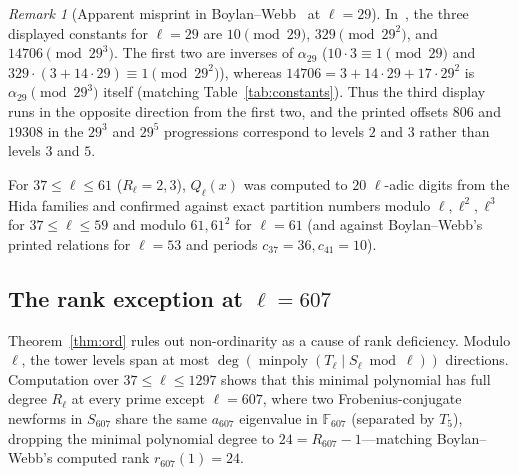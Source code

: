 \documentclass[11pt,reqno]{amsart}
\theoremstyle{definition}
\theoremstyle{remark}
\newtheorem{remark}[theorem]{Remark}
\newcommand{\F}{\mathbb{F}}
\begin{document}
\begin{remark}[Apparent misprint in Boylan--Webb~\cite{BW} at $\ell = 29$]
In~\cite[\S6.1]{BW}, the three displayed constants for $\ell = 29$ are $10 \pmod{29}$, $329 \pmod{29^2}$, and $14706 \pmod{29^3}$. The first two are inverses of $\alpha_{29}$ ($10 \cdot 3 \equiv 1 \pmod{29}$ and $329 \cdot (3 + 14\cdot 29) \equiv 1 \pmod{29^2}$), whereas $14706 = 3 + 14\cdot 29 + 17\cdot 29^2$ is $\alpha_{29} \pmod{29^3}$ itself (matching Table~\ref{tab:constants}). Thus the third display runs in the opposite direction from the first two, and the printed offsets $806$ and $19308$ in the $29^3$ and $29^5$ progressions correspond to levels $2$ and $3$ rather than levels $3$ and $5$.
\end{remark}

For $37 \le \ell \le 61$ ($R_\ell = 2, 3$), $Q_\ell(x)$ was computed to $20$ $\ell$-adic digits from the Hida families and confirmed against exact partition numbers modulo $\ell, \ell^2, \ell^3$ for $37 \le \ell \le 59$ and modulo $61, 61^2$ for $\ell = 61$ (and against Boylan--Webb's printed relations for $\ell = 53$ and periods $c_{37} = 36, c_{41} = 10$).

\subsection{The rank exception at $\ell = 607$}\label{sec:607}
Theorem~\ref{thm:ord} rules out non-ordinarity as a cause of rank deficiency. Modulo $\ell$, the tower levels span at most $\deg(\operatorname{minpoly}(T_\ell \mid S_\ell \bmod \ell))$ directions. Computation over $37 \le \ell \le 1297$ shows that this minimal polynomial has full degree $R_\ell$ at every prime except $\ell = 607$, where two Frobenius-conjugate newforms in $S_{607}$ share the same $a_{607}$ eigenvalue in $\F_{607}$ (separated by $T_5$), dropping the minimal polynomial degree to $24 = R_{607} - 1$---matching Boylan--Webb's computed rank $r_{607}(1) = 24$.
\end{document}
